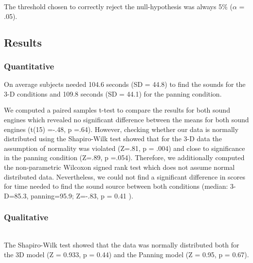 \documentclass[journal]{IEEEtran}
\begin{document}
The threshold chosen to correctly reject the null-hypothesis was always 5\% ($\alpha$ = .05).

\subsection{Results}
\subsubsection{Quantitative}
On average subjects needed 104.6 seconds (SD = 44.8) to find the sounds for the 3-D conditions and 109.8 seconds (SD = 44.1) for the panning condition. 

We computed a paired samples t-test to compare the results for both sound engines which revealed no significant difference between the means for both sound engines (t(15) =-.48, p =.64). However, checking whether our data is normally distributed using the Shapiro-Wilk test showed that for the 3-D data the assumption of normality was violated (Z=.81, p = .004) and close to significance in the panning condition (Z=.89, p =.054). Therefore, we additionally computed the non-parametric Wilcoxon signed rank test which does not assume normal distributed data. Nevertheless, we could not find a significant difference in scores for time needed to find the sound source between both conditions (median: 3-D=85.3, panning=95.9; Z=-.83, p = 0.41 ). 

\subsubsection{Qualitative}~\\
The Shapiro-Wilk test showed that the data was normally distributed both for the 3D model (Z = 0.933, p = 0.44) and the Panning model (Z = 0.95, p = 0.67). 
\end{document}
